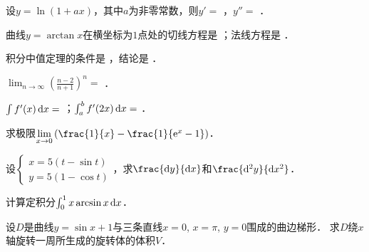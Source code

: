 \documentclass[plain,noanswer,medmath]{../../template/jnuexam}
\begin{document}






\begin{problem}
设$y=\ln(1+ax)$，其中$a$为非零常数，则$y'=$ \fillin{}，$y''=$ \fillin{}．
\end{problem}


\begin{problem}
曲线$y = \arctan x$在横坐标为$1$点处的切线方程是 \fillin{}；法线方程是 \fillin{}．
\end{problem}


\begin{problem}
积分中值定理的条件是 \fillin{}，结论是 \fillin{}．
\end{problem}


\begin{problem}
$\lim_{n\to\infty}\left(\frac{n-2}{n+1}\right)^n=$ \fillin{}．
\end{problem}


\begin{problem}
$\int f'(x)\mathop{}\!\mathrm{d} x =$ \fillin{}；$\int_a^b f'(2x)\mathop{}\!\mathrm{d} x =$ \fillin{}．
\end{problem}



\begin{problem}
求极限$\lim_{x \to 0} \left(\frac{1}{x} - \frac{1}{\e^x - 1}\right)$．
\end{problem}



\begin{problem}
设$\begin{cases}
  x = 5(t - \sin t) \\
  y = 5(1 - \cos t)
\end{cases}$，求$\frac{\dy}{\dx}$和$\frac{\d^2y}{\dx^2}$．
\end{problem}



\begin{problem}
计算定积分$\int_0^1x\arcsin x\mathop{}\!\mathrm{d} x$．
\end{problem}



\begin{problem}
设$D$是曲线$y = \sin x + 1$与三条直线$x = 0$, $x = \pi$, $y = 0$围成的曲边梯形．
求$D$绕$x$轴旋转一周所生成的旋转体的体积$V$．
\end{problem}
\end{document}
